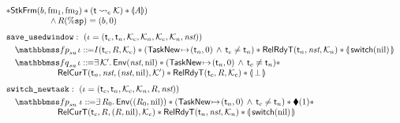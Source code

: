\begin{figure}[!thp]
\[\begin{array}{l}
            \sepstar \RelStkFm{\block}{\fm_1}{\fm_2} 
            \sepstar (\astCurCont{\thrdid}{\hthrdlocalst}) \sepstar 
            \safePrimAst{\primcom}) \\
            \hspace*{5em}
            \, \land \, \RFile(\spreg) = (\block, 0) \\
            \\[-5pt]
            \texttt{save\_usedwindow}: \ 
            (\lgvl = (\thrdid_c, \thrdid_n, \hthrdlocalst_c, \hthrdlocalst_n, 
                \hthrdlocalst_c, \hthrdlocalst_n, \nst)) \\
            \\[-9pt]
            \quad
            \relspecpre_{\textit{su}} \, \lgvl \define 
            I(\thrdid_c, \RFile, \hthrdlocalst_c) \sepstar 
            (\msto{\TaskNew}{(\thrdid_n, 0)} \, \land \, \thrdid_c \neq \thrdid_n) 
            \sepstar
            \RelRdyT{\thrdid_n}{\nst}{\hthrdlocalst_n} \sepstar 
            \safePrimAst{\, \primsw(\nil) \,} \\
            \\[-9pt]
            \quad
            \relspecpost_{\textit{su}} \, \lgvl \define 
            \exists \, \hthrdlocalst'. \, 
            \Env{\nst, \nil} \sepstar 
            (\msto{\TaskNew}{(\thrdid_n, 0)} \, \land \, \thrdid_c \neq \thrdid_n) \sepstar \\
            \hspace*{6em}
            \RelCurT{\thrdid_n}{\nst}{(\nst, \nil)}{\hthrdlocalst'} 
            \sepstar \RelRdyT{\thrdid_c}{\RFile}{\hthrdlocalst_c}
            \sepstar \safePrimAst{\, \primdone \,}
            \\
            \\[-5pt]
            \texttt{switch\_newtask}: \ (\lgvl = (\thrdid_c, \thrdid_n, \hthrdlocalst_c, 
            \hthrdlocalst_n, \RFile, \nst)) \\
            \\[-9pt]
            \quad 
            \relspecpre_{\textit{sn}} \ \lgvl \define 
            \exists \, \RFile_0. \, \Env{(\RFile_0, \nil)} \sepstar 
            (\msto{\TaskNew}{(\thrdid_n, 0)} \, \land \, \thrdid_c \neq \thrdid_n)
            \sepstar \metricAst{1} \sepstar \\
            \hspace*{6em}
            \RelCurT{\thrdid_c}{\RFile}{(\RFile, \nil)}{\hthrdlocalst_c} \sepstar
            \RelRdyT{\thrdid_n}{\nst}{\hthrdlocalst_n} \sepstar 
            \safePrimAst{\, \primsw(\nil) \,} \\

\end{array}\]
\end{figure}
